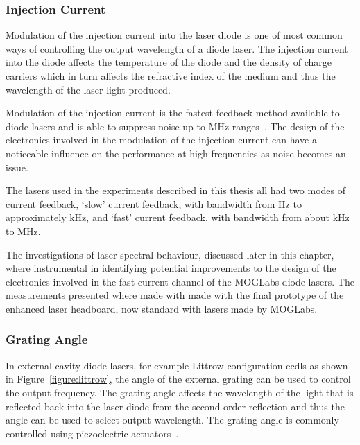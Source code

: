 \subsubsection{Injection Current}
Modulation of the injection current into the laser diode is one of most common ways of controlling the output wavelength of a diode laser.
The injection current into the diode affects the temperature of the diode and the density of charge carriers which in turn affects the refractive index of the medium and thus the wavelength of the laser light produced.

Modulation of the injection current is the fastest feedback method available to diode lasers and is able to suppress noise up to \unit{MHz} ranges~\cite{ludlow_compact_2007,torrance_sub-kilohertz_2016}.
The design of the electronics involved in the modulation of the injection current can have a noticeable influence on the performance at high frequencies as noise becomes an issue.

The lasers used in the experiments described in this thesis all had two modes of current feedback, `slow' current feedback, with bandwidth from \unit[0]{Hz} to approximately \unit[100]{kHz}, and `fast' current feedback, with bandwidth from about \unit[100]{kHz} to \unit[50]{MHz}.

The investigations of laser spectral behaviour, discussed later in this chapter, where instrumental in identifying potential improvements to the design of the electronics involved in the fast current channel of the MOGLabs diode lasers.
The measurements presented where made with made with the final prototype of the enhanced laser headboard, now standard with lasers made by MOGLabs.

\subsubsection{Grating Angle}
In external cavity diode lasers, for example Littrow configuration \glspl{ecdl} as shown in Figure~\ref{figure:littrow}, the angle of the external grating can be used to control the output frequency.
The grating angle affects the wavelength of the light that is reflected back into the laser diode from the second-order reflection and thus the angle can be used to select output wavelength.
The grating angle is commonly controlled using piezoelectric actuators~\cite{hawthorn_littrow_2001}.

